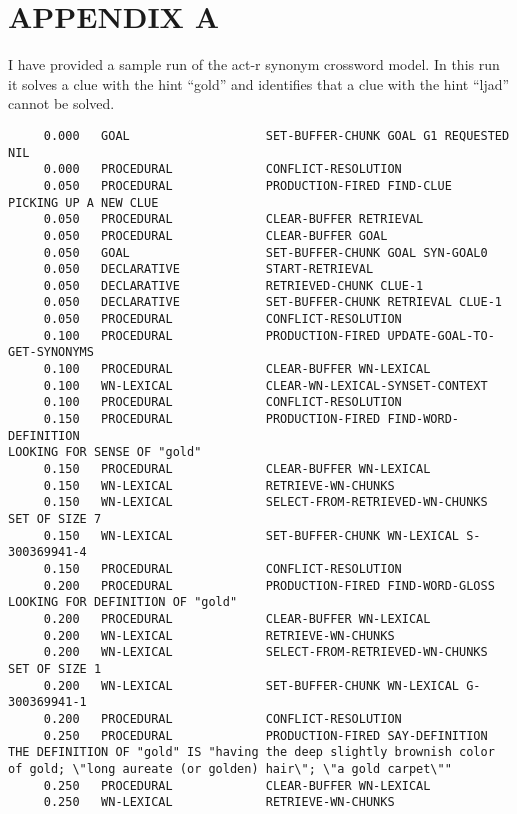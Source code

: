 \headsep 0.8in
\section*{APPENDIX A}
I have provided a sample run of the act-r synonym crossword model. In this run it solves a clue with the hint ``gold'' and identifies that a clue with the hint ``ljad'' cannot be solved.

\begin{verbatim}
     0.000   GOAL                   SET-BUFFER-CHUNK GOAL G1 REQUESTED NIL 
     0.000   PROCEDURAL             CONFLICT-RESOLUTION 
     0.050   PROCEDURAL             PRODUCTION-FIRED FIND-CLUE 
PICKING UP A NEW CLUE 
     0.050   PROCEDURAL             CLEAR-BUFFER RETRIEVAL 
     0.050   PROCEDURAL             CLEAR-BUFFER GOAL 
     0.050   GOAL                   SET-BUFFER-CHUNK GOAL SYN-GOAL0 
     0.050   DECLARATIVE            START-RETRIEVAL 
     0.050   DECLARATIVE            RETRIEVED-CHUNK CLUE-1 
     0.050   DECLARATIVE            SET-BUFFER-CHUNK RETRIEVAL CLUE-1 
     0.050   PROCEDURAL             CONFLICT-RESOLUTION 
     0.100   PROCEDURAL             PRODUCTION-FIRED UPDATE-GOAL-TO-GET-SYNONYMS 
     0.100   PROCEDURAL             CLEAR-BUFFER WN-LEXICAL 
     0.100   WN-LEXICAL             CLEAR-WN-LEXICAL-SYNSET-CONTEXT 
     0.100   PROCEDURAL             CONFLICT-RESOLUTION 
     0.150   PROCEDURAL             PRODUCTION-FIRED FIND-WORD-DEFINITION 
LOOKING FOR SENSE OF "gold" 
     0.150   PROCEDURAL             CLEAR-BUFFER WN-LEXICAL 
     0.150   WN-LEXICAL             RETRIEVE-WN-CHUNKS 
     0.150   WN-LEXICAL             SELECT-FROM-RETRIEVED-WN-CHUNKS SET OF SIZE 7 
     0.150   WN-LEXICAL             SET-BUFFER-CHUNK WN-LEXICAL S-300369941-4 
     0.150   PROCEDURAL             CONFLICT-RESOLUTION 
     0.200   PROCEDURAL             PRODUCTION-FIRED FIND-WORD-GLOSS 
LOOKING FOR DEFINITION OF "gold" 
     0.200   PROCEDURAL             CLEAR-BUFFER WN-LEXICAL 
     0.200   WN-LEXICAL             RETRIEVE-WN-CHUNKS 
     0.200   WN-LEXICAL             SELECT-FROM-RETRIEVED-WN-CHUNKS SET OF SIZE 1 
     0.200   WN-LEXICAL             SET-BUFFER-CHUNK WN-LEXICAL G-300369941-1 
     0.200   PROCEDURAL             CONFLICT-RESOLUTION 
     0.250   PROCEDURAL             PRODUCTION-FIRED SAY-DEFINITION 
THE DEFINITION OF "gold" IS "having the deep slightly brownish color of gold; \"long aureate (or golden) hair\"; \"a gold carpet\"" 
     0.250   PROCEDURAL             CLEAR-BUFFER WN-LEXICAL 
     0.250   WN-LEXICAL             RETRIEVE-WN-CHUNKS 

\end{verbatim}
